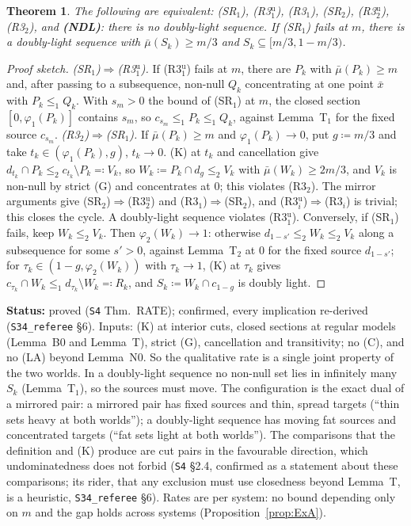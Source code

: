 \documentclass[11pt]{article}
\newtheorem{theorem}{Theorem}[section]
\theoremstyle{definition}
\theoremstyle{remark}
\newcommand{\src}[1]{\texttt{#1}}
\newcommand{\status}[1]{\par\smallskip\noindent\textbf{Status:} #1\par\smallskip}
\begin{document}
\begin{theorem}\label{thm:RATE}
The following are equivalent: (SR$_1$), (R3$_1^{\mathrm u}$), (R3$_1$), (SR$_2$), (R3$_2^{\mathrm u}$), (R3$_2$), and \textbf{(NDL)}: there is no doubly-light sequence. If (SR$_1$) fails at $m$, there is a doubly-light sequence with $\bar\mu(S_k)\ge m/3$ and $S_k\subseteq[m/3,1-m/3)$.
\end{theorem}
\begin{proof}[Proof sketch]
\emph{(SR$_1$)$\Rightarrow$(R3$_1^{\mathrm u}$).} If (R3$_1^{\mathrm u}$) fails at $m$, there are $P_k$ with $\bar\mu(P_k)\ge m$ and, after passing to a subsequence, non-null $Q_k$ concentrating at one point $\bar x$ with $P_k\le_1Q_k$. With $s_m>0$ the bound of (SR$_1$) at $m$, the closed section $[0,\varphi_1(P_k)]$ contains $s_m$, so $c_{s_m}\le_1P_k\le_1Q_k$, against Lemma~T$_1$ for the fixed source $c_{s_m}$. \emph{(R3$_2$)$\Rightarrow$(SR$_1$).} If $\bar\mu(P_k)\ge m$ and $\varphi_1(P_k)\to0$, put $g\coloneqq m/3$ and take $t_k\in(\varphi_1(P_k),g)$, $t_k\to0$. (K) at $t_k$ and cancellation give $d_{t_k}\cap P_k\le_2c_{t_k}\setminus P_k\eqqcolon V_k$, so $W_k\coloneqq P_k\cap d_g\le_2V_k$ with $\bar\mu(W_k)\ge2m/3$, and $V_k$ is non-null by strict (G) and concentrates at $0$; this violates (R3$_2$). The mirror arguments give (SR$_2$)$\Rightarrow$(R3$_2^{\mathrm u}$) and (R3$_1$)$\Rightarrow$(SR$_2$), and (R3$_i^{\mathrm u}$)$\Rightarrow$(R3$_i$) is trivial; this closes the cycle. A doubly-light sequence violates (R3$_1^{\mathrm u}$). Conversely, if (SR$_1$) fails, keep $W_k\le_2V_k$. Then $\varphi_2(W_k)\to1$: otherwise $d_{1-s'}\le_2W_k\le_2V_k$ along a subsequence for some $s'>0$, against Lemma~T$_2$ at $0$ for the fixed source $d_{1-s'}$; for $\tau_k\in(1-g,\varphi_2(W_k))$ with $\tau_k\to1$, (K) at $\tau_k$ gives $c_{\tau_k}\cap W_k\le_1d_{\tau_k}\setminus W_k\eqqcolon R_k$, and $S_k\coloneqq W_k\cap c_{1-g}$ is doubly light.
\end{proof}
\status{proved (\src{S4} Thm.~RATE); confirmed, every implication re-derived (\src{S34\_referee} \S6). Inputs: (K) at interior cuts, closed sections at regular models (Lemma~B0 and Lemma~T), strict (G), cancellation and transitivity; no (C), and no (LA) beyond Lemma~N0. So the qualitative rate is a single joint property of the two worlds. In a doubly-light sequence no non-null set lies in infinitely many $S_k$ (Lemma~T$_1$), so the sources must move. The configuration is the exact dual of a mirrored pair: a mirrored pair has fixed sources and thin, spread targets (``thin sets heavy at both worlds''); a doubly-light sequence has moving fat sources and concentrated targets (``fat sets light at both worlds''). The comparisons that the definition and (K) produce are cut pairs in the favourable direction, which undominatedness does not forbid (\src{S4} \S2.4, confirmed as a statement about these comparisons; its rider, that any exclusion must use closedness beyond Lemma~T, is a heuristic, \src{S34\_referee} \S6). Rates are per system: no bound depending only on $m$ and the gap holds across systems (Proposition~\ref{prop:ExA}).}
\end{document}
